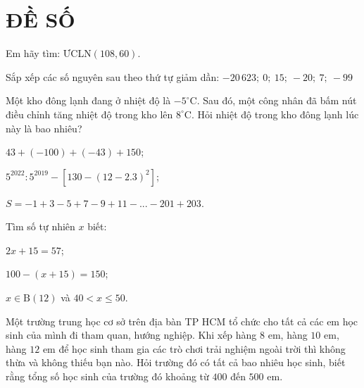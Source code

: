 \section{ĐỀ SỐ \thesection }%
\setcounter{bt}{0}

\begin{bt} \textbf{ } 
	\begin{listEX}
		\item Em hãy tìm: ƯCLN$(108,60)$.
		\item Sắp xếp các số nguyên sau theo thứ tự giảm dần: $-20\,623 ;\ 0 ;\ 15 ;\ -20 ;\ 7 ;\ -99$
		\item Một kho đông lạnh đang ở nhiệt độ là $-5^{\circ}$C. Sau đó, một công nhân đã bấm nút điều chỉnh tăng nhiệt độ trong kho lên $8^{\circ} \mathrm{C}$. Hỏi nhiệt độ trong kho đông lạnh lúc này là bao nhiêu?
	\end{listEX}
	
\end{bt}


\begin{bt} \textbf{ }
	\begin{listEX}[2]
		\item $43+(-100)+(-43)+150$;
		\item $5^{2022}:5^{2019}-[130-(12-2.3)^2]$;
		\item $S = -1+3-5+7-9+11-...-201+203$.
	\end{listEX}
\end{bt}




\begin{bt} Tìm số tự nhiên $x$ biết:
	\begin{listEX}[3]
		\item $2x + 15 = 57$;
		\item $100 - (x + 15) = 150$;
		\item $x \in \text{B}(12)$ và $40 < x \leqslant 50$.
	\end{listEX}
	
\end{bt}


\begin{bt} Một trường trung học cơ sở trên địa bàn TP HCM tổ chức cho tất cả các em học sinh của mình đi tham quan, hướng nghiệp. Khi xếp hàng $8$ em, hàng $10$ em, hàng $12$ em để học sinh tham gia các trò chơi trải nghiệm ngoài trời thì không thừa và không thiếu bạn nào. Hỏi trường đó có tất cả bao nhiêu học sinh, biết rằng tổng số học sinh của trường đó khoảng từ $400$ đến $500$ em.
	
\end{bt}


